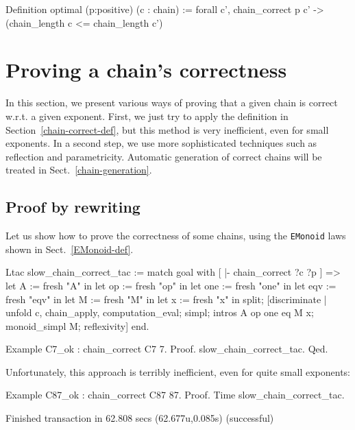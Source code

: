  \begin{Coqsrc}
Definition optimal (p:positive) (c : chain) :=
 forall c', chain_correct p c' -> 
            (chain_length c <= chain_length c')%
 \end{Coqsrc}

\section{Proving a chain's correctness}
\label{chain-correctness-sect}
In this section, we present various ways of proving that a given chain is 
correct w.r.t. a given exponent. First, we just try to apply 
the definition in Section~\vref{chain-correct-def}, but this method is very 
inefficient, even for small exponents. In a second step, we use more sophisticated techniques such as reflection and parametricity. Automatic generation of correct chains will be treated in Sect.~\vref{chain-generation}.

\subsection{Proof by rewriting}
Let us show how to prove  the correctness of some chains, using
the \texttt{EMonoid} laws shown in Sect.~\vref{EMonoid-def}. 

\begin{Coqsrc}
Ltac slow_chain_correct_tac :=
  match goal with 
      [ |- chain_correct ?c ?p ] =>
      let A := fresh "A" in
      let op := fresh "op" in
      let one := fresh "one" in
      let eqv := fresh "eqv" in
      let M := fresh "M" in
      let x := fresh "x"
      in  split;
        [discriminate | 
         unfold c, chain_apply, computation_eval; simpl;
         intros A op one eq M x; monoid_simpl M; reflexivity]
  end.


Example C7_ok : chain_correct C7 7.
Proof.
   slow_chain_correct_tac.
Qed.
\end{Coqsrc}

Unfortunately, this approach is terribly inefficient, even for quite small exponents:


\begin{Coqsrc}
Example C87_ok : chain_correct C87 87.
Proof.
 Time  slow_chain_correct_tac. 
\end{Coqsrc}

\begin{Coqanswer}
 Finished transaction in 62.808 secs (62.677u,0.085s) (successful)   
 \end{Coqanswer}

